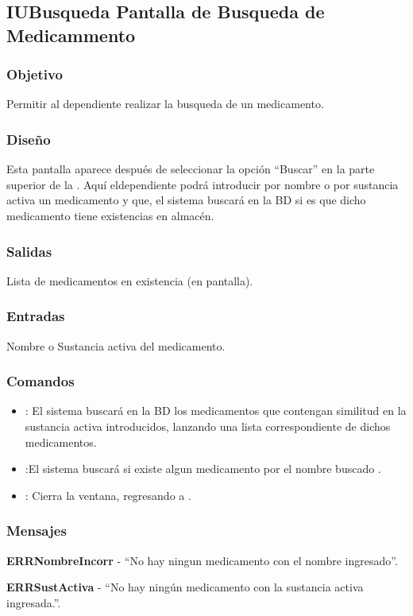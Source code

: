\subsection{IUBusqueda Pantalla de Busqueda de Medicammento}

\subsubsection{Objetivo}
	Permitir al dependiente realizar la busqueda de un medicamento.

\subsubsection{Diseño}
	Esta pantalla aparece despu\'es de seleccionar la opci\'on "`Buscar"' en la parte superior de la \label{IUCompra}. Aqu\'i eldependiente podr\'a introducir por nombre o por sustancia activa un medicamento y que, el sistema buscar\'a en la BD si es que dicho medicamento tiene existencias en almac\'en.


\subsubsection{Salidas}

	Lista de medicamentos en existencia (en pantalla).

\subsubsection{Entradas}
Nombre o Sustancia activa del medicamento.

\subsubsection{Comandos}
\begin{itemize}
		\item {}: El sistema buscar\'a en la BD los medicamentos que contengan similitud en la sustancia activa introducidos, lanzando una lista correspondiente de dichos medicamentos.
		\item {}:El sistema buscar\'a si existe algun medicamento por el nombre buscado .
		\item {}: Cierra la ventana, regresando a  \label{IUCompra}.
\end{itemize}

\subsubsection{Mensajes}
	\begin{Citemize}
		\item {\bf ERRNombreIncorr} - "`No hay ningun medicamento con el nombre ingresado"'.
		\item {\bf ERRSustActiva} - "`No hay ning\'un medicamento con la sustancia activa ingresada."'.
	\end{Citemize}